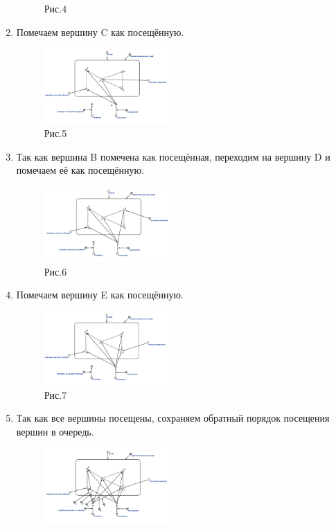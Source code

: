 \documentclass[10pt,a4paper,twocolumn]{article}
\begin{document}
\begin{enumerate}
\begin{figure}[h]
		\caption{Рис.4}
	\end{figure}
	\item Помечаем вершину C как посещённую.
	\begin{figure}[h]
		\includegraphics[width=0.45\textwidth]{img/5.png}
		\caption{Рис.5}
	\end{figure}
    \newpage
	\item Так как вершина B помечена как посещённая, переходим на вершину D и помечаем её как посещённую.
	\begin{figure}[h]
		\includegraphics[width=0.45\textwidth]{img/6.png}
		\caption{Рис.6}
	\end{figure}
	\item Помечаем вершину E как посещённую.
	\begin{figure}[h]
		\includegraphics[width=0.45\textwidth]{img/7.png}
		\caption{Рис.7}
	\end{figure}
	\item Так как все вершины посещены, сохраняем обратный порядок посещения вершин в очередь.
    \begin{figure}[h]
		\includegraphics[width=0.45\textwidth]{img/8.png}

\end{figure}
\end{enumerate}
\end{document}
